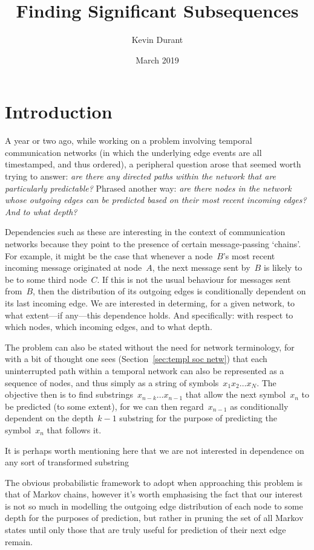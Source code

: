 \documentclass[11pt,a4paper]{article}
\title{Finding Significant Subsequences}
\author{Kevin Durant}
\date{March 2019}
\begin{document}
\maketitle

\section{Introduction} %

A year or two ago, while working on a problem involving temporal communication
networks (in which the underlying edge events are all timestamped, and thus
ordered), a peripheral question arose that seemed worth trying to answer:
\textit{are there any directed paths within the network that are particularly
predictable?} Phrased another way: \textit{are there nodes in the network whose
outgoing edges can be predicted based on their most recent incoming edges? And
to what depth?}

Dependencies such as these are interesting in the context of communication
networks because they point to the presence of certain message-passing `chains'.
For example, it might be the case that whenever a node~$B$'s most recent
incoming message originated at node~$A$, the next message sent by~$B$ is likely
to be to some third node~$C$. If this is not the usual behaviour for messages
sent from~$B$, then the distribution of its outgoing edges is conditionally
dependent on its last incoming edge. We are interested in determing, for a given
network, to what extent---if any---this dependence holds. And specifically: with
respect to which nodes, which incoming edges, and to what depth.

The problem can also be stated without the need for network terminology, for
with a bit of thought one sees (Section~\ref{sec:templ soc netw}) that each
uninterrupted path within a temporal network can also be represented as a
sequence of nodes, and thus simply as a string of symbols~$x_1 x_2 \dots x_N$.
The objective then is to find substrings~$x_{n-k} \dots x_{n-1}$ that allow the
next symbol~$x_n$ to be predicted (to some extent), for we can then
regard~$x_{n-1}$ as conditionally dependent on the depth~$k-1$ substring for the
purpose of predicting the symbol~$x_n$ that follows it.

It is perhaps worth mentioning here that we are not interested in dependence on
any sort of transformed substring

The obvious probabilistic framework to adopt when approaching this problem is
that of Markov chains, however it's worth emphasising the fact that our interest
is not so much in modelling the outgoing edge distribution of each node to some
depth for the purposes of prediction, but rather in pruning the set of all
Markov states until only those that are truly useful for prediction of their
next edge remain.
\end{document}

